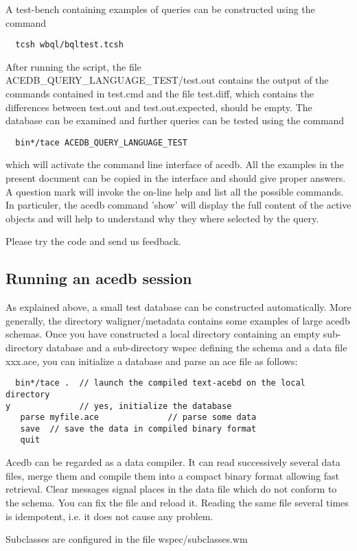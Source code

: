 \documentclass[11pt]{article}
\newcommand{\BL}{\begin{lstlisting}}
\begin{document}
A test-bench containing examples of queries can be constructed
using the command
\BL
  tcsh wbql/bqltest.tcsh
\end{lstlisting}
After running the script, 
the file ACEDB\_QUERY\_LANGUAGE\_TEST/test.out contains the output of
the commands contained in test.cmd and the file test.diff,
which contains the differences between test.out and test.out.expected, should be empty.
The database can be examined and
further queries can be tested using the command
\BL
  bin*/tace ACEDB_QUERY_LANGUAGE_TEST
\end{lstlisting}
which will activate the command line interface of acedb. All the examples
in the present document can be copied in the interface and
should give proper answers. A question mark will invoke
the on-line help and list all the possible commands.
In particuler, the acedb command 'show' will display
the full content of the active objects and will help to understand why 
they where selected by the query. 

Please try the code and send us feedback. 



\subsection {Running an acedb session}

As explained above, a small test database can be constructed
automatically.
More generally, the directory waligner/metadata contains 
some examples of large acedb schemas.
Once you have constructed a local directory
containing an empty sub-directory database and a sub-directory wspec
defining the schema and a data file xxx.ace, you can
initialize a database and parse an ace file as follows:
\BL
  bin*/tace .  // launch the compiled text-acebd on the local directory
y              // yes, initialize the database
   parse myfile.ace              // parse some data
   save  // save the data in compiled binary format 
   quit
\end{lstlisting}
 Acedb can be regarded as a data compiler. It can read successively several
data files, merge them and compile them into a compact binary format allowing
fast retrieval. Clear messages signal places in the data file which do not conform
to the schema. You can fix the file and reload it. Reading the same file several
times is idempotent, i.e. it does not cause any problem.

Subclasses are configured in the file wspec/subclasses.wm
\end{document}
